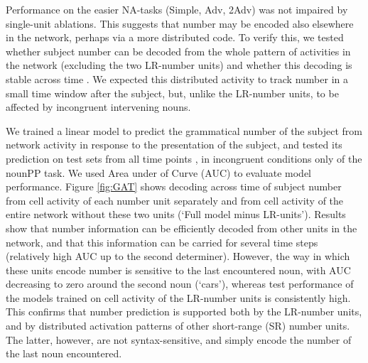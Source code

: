 Performance on the easier NA-tasks (Simple, Adv, 2Adv) was not
impaired by single-unit ablations. This suggests that number may be
encoded also elsewhere in the network, perhaps via a more distributed
code. To verify this, we tested whether subject number can be decoded from the whole
pattern of activities in the network (excluding the two LR-number units)
and whether this decoding is stable across time \cite[see][for similar
observations and related methods]{Giulianelli:etal:2018}. We expected
this distributed activity to track number in a
small time window after the subject, but, unlike the LR-number units,
to be affected by incongruent intervening nouns.

We trained a linear model to predict the grammatical number of the
subject from network activity in response to the presentation of the
subject, and tested its prediction on test sets from all time points
\cite{King:Dehaene:2014}, in incongruent conditions only of the nounPP
task. We used Area under of Curve (AUC) to evaluate model
performance. Figure \ref{fig:GAT} shows decoding across time of
subject number from cell activity of each number unit separately and
from cell activity of the entire network without these two units
(`Full model minus LR-units'). Results show that number information
can be efficiently decoded from other units in the network, and that
this information can be carried for several time steps (relatively
high AUC up to the second determiner). However, the way in which these
units encode number is sensitive to the last encountered noun, with
AUC decreasing to zero around the second noun (`cars'), whereas test
performance of the models trained on cell activity of the LR-number
units is consistently high. This confirms that number prediction is
supported both by the LR-number units, and by distributed activation
patterns of other short-range (SR) number units. The latter, however,
are not syntax-sensitive, and simply encode the number of the last
noun encountered.

